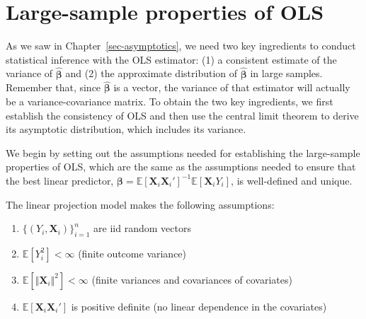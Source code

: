 \documentclass[
  13pt,
  letterpaper,
  DIV=11,
  numbers=noendperiod]{scrreprt}
\newcommand{\mb}{\symbf}
\newcommand{\E}{\mathbb{E}}
\newcommand{\X}{\mb{X}}
\newcommand{\bfbeta}{\mb{\beta}}
\newcommand{\bhat}{\widehat{\mb{\beta}}}
\theoremstyle{plain}
\theoremstyle{definition}
\theoremstyle{definition}
\theoremstyle{remark}
\begin{document}
\section{Large-sample properties of
OLS}\label{large-sample-properties-of-ols}

As we saw in Chapter~\ref{sec-asymptotics}, we need two key ingredients
to conduct statistical inference with the OLS estimator: (1) a
consistent estimate of the variance of \(\bhat\) and (2) the approximate
distribution of \(\bhat\) in large samples. Remember that, since
\(\bhat\) is a vector, the variance of that estimator will actually be a
variance-covariance matrix. To obtain the two key ingredients, we first
establish the consistency of OLS and then use the central limit theorem
to derive its asymptotic distribution, which includes its variance.

We begin by setting out the assumptions needed for establishing the
large-sample properties of OLS, which are the same as the assumptions
needed to ensure that the best linear predictor,
\(\bfbeta = \E[\X_{i}\X_{i}']^{-1}\E[\X_{i}Y_{i}]\), is well-defined and
unique.

\begin{tcolorbox}[enhanced jigsaw, title=\textcolor{quarto-callout-note-color}{\faInfo}\hspace{0.5em}{Linear projection assumptions}, breakable, colbacktitle=quarto-callout-note-color!10!white, toptitle=1mm, colback=white, arc=.35mm, left=2mm, opacityback=0, titlerule=0mm, colframe=quarto-callout-note-color-frame, leftrule=.75mm, coltitle=black, opacitybacktitle=0.6, bottomtitle=1mm, rightrule=.15mm, bottomrule=.15mm, toprule=.15mm]

The linear projection model makes the following assumptions:

\begin{enumerate}
\def\labelenumi{\arabic{enumi}.}
\item
  \(\{(Y_{i}, \X_{i})\}_{i=1}^n\) are iid random vectors
\item
  \(\E[Y^{2}_{i}] < \infty\) (finite outcome variance)
\item
  \(\E[\Vert \X_{i}\Vert^{2}] < \infty\) (finite variances and
  covariances of covariates)
\item
  \(\E[\X_{i}\X_{i}']\) is positive definite (no linear dependence in
  the covariates)
\end{enumerate}

\end{tcolorbox}
\end{document}
